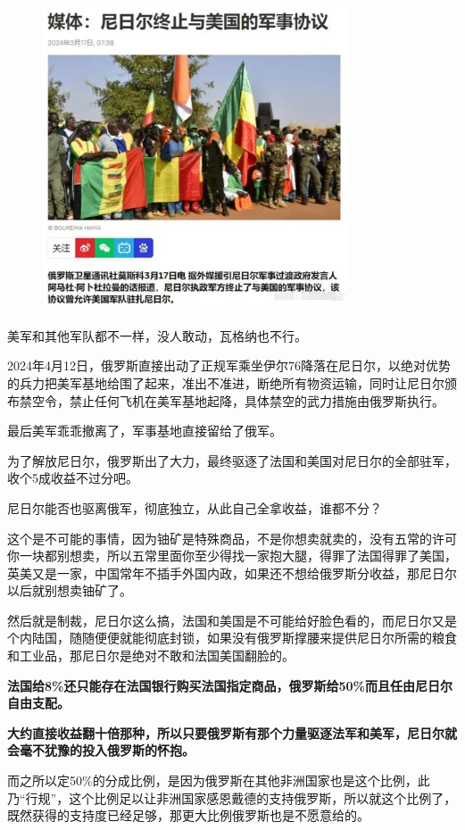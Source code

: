 \documentclass[UTF8, 11pt, oneside]{ctexart}
\newcommand{\zd}[1]{\textbf{\textcolor[RGB]{123,12,0}{#1}}} %
\begin{document}
\begin{figure}[H]
    \centering
    \includegraphics[width=9cm]{2024-08-08-002.jpg}
\end{figure}

美军和其他军队都不一样，没人敢动，瓦格纳也不行。

2024年4月12日，俄罗斯直接出动了正规军乘坐伊尔76降落在尼日尔，以绝对优势的兵力把美军基地给围了起来，准出不准进，断绝所有物资运输，同时让尼日尔颁布禁空令，禁止任何飞机在美军基地起降，具体禁空的武力措施由俄罗斯执行。

最后美军乖乖撤离了，军事基地直接留给了俄军。

为了解放尼日尔，俄罗斯出了大力，最终驱逐了法国和美国对尼日尔的全部驻军，收个5成收益不过分吧。

尼日尔能否也驱离俄军，彻底独立，从此自己全拿收益，谁都不分？

这个是不可能的事情，因为铀矿是特殊商品，不是你想卖就卖的，没有五常的许可你一块都别想卖，所以五常里面你至少得找一家抱大腿，得罪了法国得罪了美国，英美又是一家，中国常年不插手外国内政，如果还不想给俄罗斯分收益，那尼日尔以后就别想卖铀矿了。

然后就是制裁，尼日尔这么搞，法国和美国是不可能给好脸色看的，而尼日尔又是个内陆国，随随便便就能彻底封锁，如果没有俄罗斯撑腰来提供尼日尔所需的粮食和工业品，那尼日尔是绝对不敢和法国美国翻脸的。

\zd{法国给8\%还只能存在法国银行购买法国指定商品，俄罗斯给50\%而且任由尼日尔自由支配。}

\zd{大约直接收益翻十倍那种，所以只要俄罗斯有那个力量驱逐法军和美军，尼日尔就会毫不犹豫的投入俄罗斯的怀抱。}

而之所以定50\%的分成比例，是因为俄罗斯在其他非洲国家也是这个比例，此乃“行规”，这个比例足以让非洲国家感恩戴德的支持俄罗斯，所以就这个比例了，既然获得的支持度已经足够，那更大比例俄罗斯也是不愿意给的。
\end{document}
